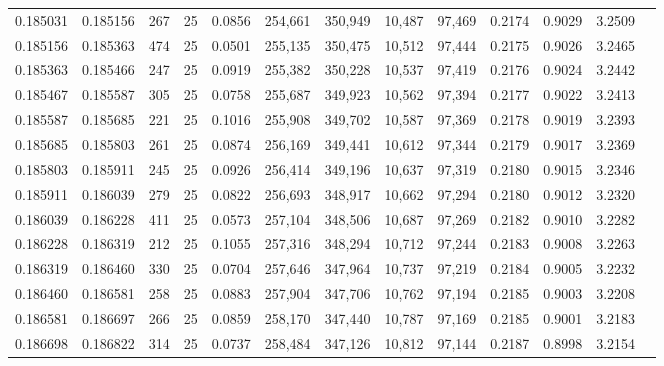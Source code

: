 \begin{tabular}{rrrrrrrrrrrrr}
0.185031 & 0.185156 &   267 &  25 &                                     0.0856 & 254,661 & 350,949 &  10,487 &  97,469 & 0.2174 & 0.9029 & 3.2509 \\
0.185156 & 0.185363 &   474 &  25 &                                     0.0501 & 255,135 & 350,475 &  10,512 &  97,444 & 0.2175 & 0.9026 & 3.2465 \\
0.185363 & 0.185466 &   247 &  25 &                                     0.0919 & 255,382 & 350,228 &  10,537 &  97,419 & 0.2176 & 0.9024 & 3.2442 \\
0.185467 & 0.185587 &   305 &  25 &                                     0.0758 & 255,687 & 349,923 &  10,562 &  97,394 & 0.2177 & 0.9022 & 3.2413 \\
0.185587 & 0.185685 &   221 &  25 &                                     0.1016 & 255,908 & 349,702 &  10,587 &  97,369 & 0.2178 & 0.9019 & 3.2393 \\
0.185685 & 0.185803 &   261 &  25 &                                     0.0874 & 256,169 & 349,441 &  10,612 &  97,344 & 0.2179 & 0.9017 & 3.2369 \\
0.185803 & 0.185911 &   245 &  25 &                                     0.0926 & 256,414 & 349,196 &  10,637 &  97,319 & 0.2180 & 0.9015 & 3.2346 \\
0.185911 & 0.186039 &   279 &  25 &                                     0.0822 & 256,693 & 348,917 &  10,662 &  97,294 & 0.2180 & 0.9012 & 3.2320 \\
0.186039 & 0.186228 &   411 &  25 &                                     0.0573 & 257,104 & 348,506 &  10,687 &  97,269 & 0.2182 & 0.9010 & 3.2282 \\
0.186228 & 0.186319 &   212 &  25 &                                     0.1055 & 257,316 & 348,294 &  10,712 &  97,244 & 0.2183 & 0.9008 & 3.2263 \\
0.186319 & 0.186460 &   330 &  25 &                                     0.0704 & 257,646 & 347,964 &  10,737 &  97,219 & 0.2184 & 0.9005 & 3.2232 \\
0.186460 & 0.186581 &   258 &  25 &                                     0.0883 & 257,904 & 347,706 &  10,762 &  97,194 & 0.2185 & 0.9003 & 3.2208 \\
0.186581 & 0.186697 &   266 &  25 &                                     0.0859 & 258,170 & 347,440 &  10,787 &  97,169 & 0.2185 & 0.9001 & 3.2183 \\
0.186698 & 0.186822 &   314 &  25 &                                     0.0737 & 258,484 & 347,126 &  10,812 &  97,144 & 0.2187 & 0.8998 & 3.2154 \\

\end{tabular}
